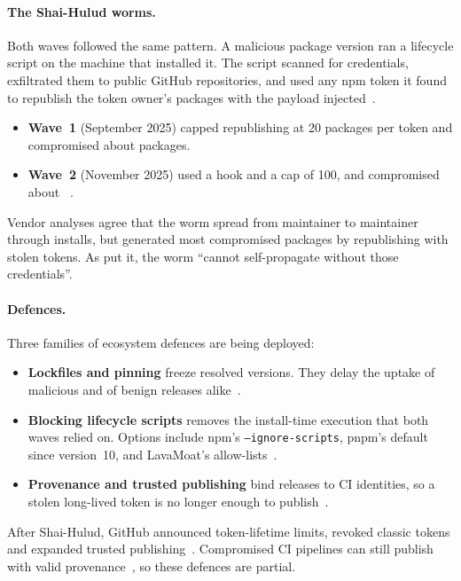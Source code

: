 \paragraph{The Shai-Hulud worms.}
Both waves followed the same pattern. A malicious package version ran a lifecycle script on the machine
that installed it. The script scanned for credentials, exfiltrated them to public GitHub repositories,
and used any npm token it found to republish the token owner's packages with the payload
injected~\citep{stepsecurity2025shaihulud,socket2025shaihulud,unit42025shaihulud,cisa2025npm}.
\begin{itemize}
  \item \textbf{Wave~1} (September 2025) capped republishing at 20 packages per token and compromised
        about \ValOneListed{} packages.
  \item \textbf{Wave~2} (November 2025) used a  hook and a cap of 100, and compromised
        about \ValTwoListed{}~\citep{wiz2025shaihulud2,datadog2025shaihulud2}.
\end{itemize}
Vendor analyses agree that the worm spread from maintainer to maintainer through installs, but
generated most compromised packages by republishing with stolen tokens. As \citet{socket2025shaihulud}
put it, the worm ``cannot self-propagate without those credentials''.

\paragraph{Defences.}
Three families of ecosystem defences are being deployed:
\begin{itemize}
  \item \textbf{Lockfiles and pinning} freeze resolved versions. They delay the uptake of malicious and
        of benign releases alike~\citep{pinckney2023semver,zerouali2022vulnerabilities}.
  \item \textbf{Blocking lifecycle scripts} removes the install-time execution that both waves relied
        on. Options include npm's \texttt{--ignore-scripts}, pnpm's default since version~10, and
        LavaMoat's allow-lists~\citep{npmdocs2026ignorescripts,pnpm2025v10,lavamoat2026allowscripts}.
  \item \textbf{Provenance and trusted publishing} bind releases to CI identities, so a stolen
        long-lived token is no longer enough to publish~\citep{github2023provenance,newman2022sigstore,
        github2025trustedpublishing,slsa2023spec}.
\end{itemize}
After Shai-Hulud, GitHub announced token-lifetime limits, revoked classic tokens and expanded trusted
publishing~\citep{github2025npmplan,github2025classictokens}. Compromised CI pipelines can still publish
with valid provenance~\citep{wiz2025singularity,unit422026npmlandscape}, so these defences are partial.

